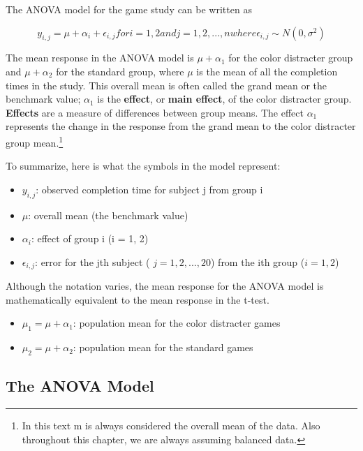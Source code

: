 \documentclass[
]{report}
\providecommand{\tightlist}{%
  \setlength{\itemsep}{0pt}\setlength{\parskip}{0pt}}
\begin{document}
The ANOVA model for the game study can be written as

\begin{equation}
\label{2.6} y_{i,j} = \mu + \alpha_i + \epsilon_{i,j} for i = 1, 2 and j = 1, 2, ... , n where \epsilon_{i,j} \sim N(0,\sigma^2) \tag{2.6}
\end{equation}

The mean response in the ANOVA model is \(\mu + \alpha_1\) for the color distracter group and \(\mu + \alpha_2\) for the standard group, where \(\mu\) is the mean of all the completion times in the study. This overall mean is often called the grand mean or the benchmark value; \(\alpha_1\) is the \textbf{effect}, or \textbf{main effect}, of the color distracter group. \textbf{Effects} are a measure of differences between group means. The effect \(\alpha_1\) represents the change in the response from the grand mean to the color distracter group mean.\footnote{In this text m is always considered the overall mean of the data. Also throughout this chapter, we are always assuming balanced data.}

To summarize, here is what the symbols in the model represent:

\begin{itemize}
\tightlist
\item
  \(y_{i,j}\): observed completion time for subject j from group i
\item
  \(\mu\): overall mean (the benchmark value)
\item
  \(\alpha_i\): effect of group i (i = 1, 2)
\item
  \(\epsilon_{i,j}\): error for the jth subject ( \(j = 1, 2, ... , 20\)) from the ith group (\(i = 1, 2\))
\end{itemize}

Although the notation varies, the mean response for the ANOVA model is mathematically equivalent to the mean response in the t-test.

\begin{itemize}
\tightlist
\item
  \(\mu_1 = \mu + \alpha_1\): population mean for the color distracter games
\item
  \(\mu_2 = \mu + \alpha_2\): population mean for the standard games
\end{itemize}

\subsection*{The ANOVA Model}\label{the-anova-model-1}
\end{document}
